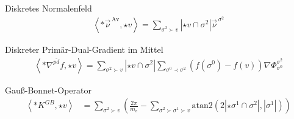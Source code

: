 \documentclass{beamer}
\newcommand{\vecover}[2]{\vec{#1}^{\,#2}}
\newcommand{\av}{\text{Av}}
\begin{document}
  \begin{frame}
    \begin{block}{Diskretes Normalenfeld}
        \begin{align*}
          \left\langle *\vecover{\nu}{\av}, \star v \right\rangle = \sum_{\sigma^{2}\succ v} \left| \star v \cap \sigma^{2}\right| 
                                          \vecover{\nu}{\sigma^{2}}
        \end{align*}
    \end{block}
    \pause
    \begin{block}{Diskreter Primär-Dual-Gradient im Mittel}
      \begin{align*}
        \left\langle *\nabla^{\overline{pd}} f, \star v \right\rangle
            = \sum_{\sigma^{2}\succ v} \left| \star v \cap \sigma^{2} \right|
                 \sum_{\sigma^{0}\prec\sigma^{2}} \left( f(\sigma^{0}) - f(v) \right) \nabla\Phi_{\sigma^{0}}^{\sigma^{2}}
      \end{align*}
    \end{block}
     \pause
    \begin{block}{Gauß-Bonnet-Operator}
       \begin{align*}
      \label{eqProbGB}
      \left\langle *K^{GB} , \star v \right\rangle &=
          \sum_{\sigma^{2}\succ v} \left( \frac{2\pi}{m_{v}} - \sum_{\sigma^{2}\succ\sigma^{1}\succ v}
                               \text{atan2}\left( 2\left|\star\sigma^{1} \cap \sigma^{2} \right|, 
                                 \left|\sigma^{1}\right|\right) \right)
    \end{align*}
    \end{block}
  \end{frame}
\end{document}
